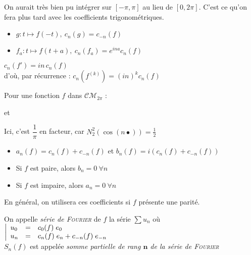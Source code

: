 \documentclass[11pt,a4paper,fleqn,pdftex]{report}
\begin{document}
On aurait très bien pu intégrer sur $[-\pi,\pi]$ au lieu de $[0,2\pi]$. C'est ce qu'on fera plus tard avec les coefficients trigonométriques.
\begin{prop}
\begin{itemize}
\item $g : t \mapsto f(-t),\: c_n(g) = c_{-n}(f)$
\item $f_a : t \mapsto f(t + a),\: c_n(f_a) = e^{ina}c_n(f)$
\end{itemize}
\end{prop}
\begin{theorem}[Dérivée de $f$]
$c_n(f') = in\, c_n(f)$ \\
d'où, par récurrence : $\boxed{c_n\left( f^{(k)}\right) = (in)^k c_n(f)}$
\end{theorem}
\begin{dfn}
Pour une fonction $f$ dans $\mathcal{CM}_{2\pi}$ :\\
\begin{center}
  et  
 \end{center}
Ici, c'est $\dfrac{1}{\pi}$ en facteur, car $N_2^2 \left( \cos(n \bullet)\right) = \frac{1}{2}$

\end{dfn}
\begin{prop}
\begin{itemize}
\item $a_n(f) = c_n(f) + c_{-n}(f)$ et $b_n(f) = i(c_n(f) + c_{-n}(f))$
\item Si $f$ est paire, alors $b_n = 0 \: \forall n$
\item Si $f$ est impaire, alors $a_n = 0 \: \forall n$
\end{itemize}
\end{prop}
En général, on utilisera ces coefficients si $f$ présente une parité.
\begin{dfn}
On appelle \emph{série de \textsc{Fourier}} de $f$ la série $\sum u_n$ où $\left|
\begin{array}{l l l l}
u_0 &=& c_0(f) \; e_0&\\
u_n &=& c_n(f) \; e_n + c_{-n}(f) \; e_{-n}
\end{array}
\right.$\\
$S_n(f)$ est appelée \emph{somme partielle de rang $\boldsymbol n$ de la série de \textsc{Fourier}}
\end{dfn}
\end{document}
